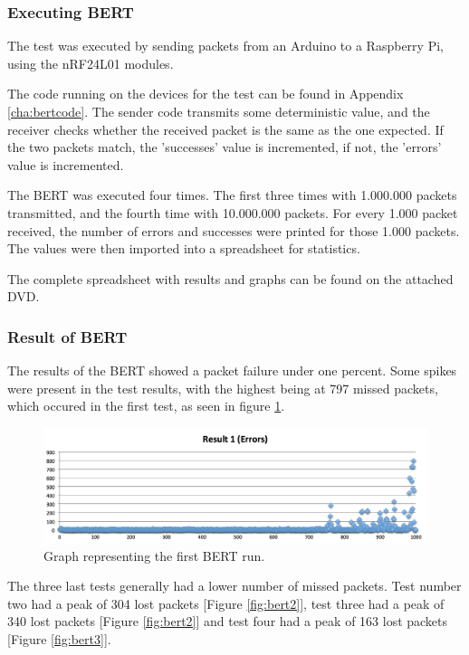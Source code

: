 \subsubsection*{Executing BERT} 
The test was executed by sending packets from an Arduino to a Raspberry Pi, using the nRF24L01 modules.

The code running on the devices for the test can be found in Appendix \ref{cha:bertcode}.
The sender code transmits some deterministic value, and the receiver checks whether the received packet is the same as the one expected. If the two packets match, the 'successes' value is incremented, if not, the 'errors' value is incremented.

The BERT was executed four times. The first three times with 1.000.000 packets transmitted, and the fourth time with 10.000.000 packets. For every 1.000 packet received, the number of errors and successes were printed for those 1.000 packets. 
The values were then imported into a spreadsheet for statistics.

The complete spreadsheet with results and graphs can be found on the attached DVD. 

\subsubsection*{Result of BERT}
The results of the BERT showed a packet failure under one percent. Some spikes were present in the test results, with the highest being at 797 missed packets, which occured in the first test, as seen in figure \ref{fig:bert1}.

\begin{figure}[h!]
\hspace*{-2cm}
\includegraphics[width=1.3\textwidth]{chapters/test/figures/res1.png}
\caption{Graph representing the first BERT run.}
\label{fig:bert1}
\end{figure}

The three last tests generally had a lower number of missed packets. Test number two had a peak of 304 lost packets [Figure \ref{fig:bert2}], test three had a peak of 340 lost packets [Figure \ref{fig:bert2}] and test four had a peak of 163 lost packets [Figure \ref{fig:bert3}].

